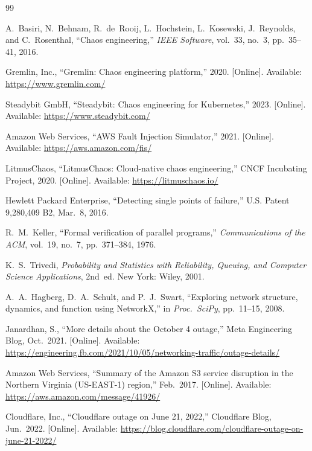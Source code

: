 \documentclass[10pt,twocolumn]{article}
\begin{document}
\begin{thebibliography}{99}

A.~Basiri, N.~Behnam, R.~de~Rooij, L.~Hochstein, L.~Kosewski,
J.~Reynolds, and C.~Rosenthal,
``Chaos engineering,''
\textit{IEEE Software}, vol.~33, no.~3, pp.~35--41, 2016.

Gremlin, Inc.,
``Gremlin: Chaos engineering platform,''
2020. [Online]. Available: \url{https://www.gremlin.com/}

Steadybit GmbH,
``Steadybit: Chaos engineering for Kubernetes,''
2023. [Online]. Available: \url{https://www.steadybit.com/}

Amazon Web Services,
``AWS Fault Injection Simulator,''
2021. [Online]. Available:
\url{https://aws.amazon.com/fis/}

LitmusChaos,
``LitmusChaos: Cloud-native chaos engineering,''
CNCF Incubating Project, 2020. [Online]. Available:
\url{https://litmuschaos.io/}

Hewlett Packard Enterprise,
``Detecting single points of failure,''
U.S. Patent 9,280,409 B2, Mar.~8, 2016.

R.~M.~Keller,
``Formal verification of parallel programs,''
\textit{Communications of the ACM}, vol.~19, no.~7,
pp.~371--384, 1976.

K.~S.~Trivedi,
\textit{Probability and Statistics with Reliability, Queuing, and
Computer Science Applications}, 2nd~ed.
New York: Wiley, 2001.

A.~A.~Hagberg, D.~A.~Schult, and P.~J.~Swart,
``Exploring network structure, dynamics, and function using NetworkX,''
in \textit{Proc.\ SciPy}, pp.~11--15, 2008.

Janardhan, S.,
``More details about the October 4 outage,''
Meta Engineering Blog, Oct.~2021. [Online]. Available:
\url{https://engineering.fb.com/2021/10/05/networking-traffic/outage-details/}

Amazon Web Services,
``Summary of the Amazon S3 service disruption in the Northern
Virginia (US-EAST-1) region,''
Feb.~2017. [Online]. Available:
\url{https://aws.amazon.com/message/41926/}

Cloudflare, Inc.,
``Cloudflare outage on June 21, 2022,''
Cloudflare Blog, Jun.~2022. [Online]. Available:
\url{https://blog.cloudflare.com/cloudflare-outage-on-june-21-2022/}


\end{thebibliography}
\end{document}

